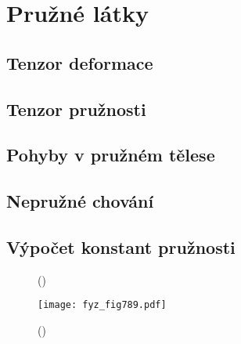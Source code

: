 \setchaptertoc
\chapter{Pružné látky}\label{fyz:IIchapIXL}

  \section{Tenzor deformace}\label{fyz:IIchapIXLsecI}
  \section{Tenzor pružnosti}\label{fyz:IIchapIXLsecII}
  \section{Pohyby v pružném tělese}\label{fyz:IIchapIXLsecIII}
  \section{Nepružné chování}\label{fyz:IIchapIXLsecIV}
  \section{Výpočet konstant pružnosti}\label{fyz:IIchapIXLsecV}

    \begin{figure}[ht!]
      \centering
                     \newline
      \label{fyz:fig788}
      \caption{
               (\cite[s.~748]{Feynman02})}
    \end{figure}

    \begin{figure}[ht!] %
      \centering
      \texttt{[image: fyz\_fig789.pdf]}
      \caption{
               (\cite[s.~707]{Feynman02})}
      \label{fyz:fig789}
    \end{figure}

